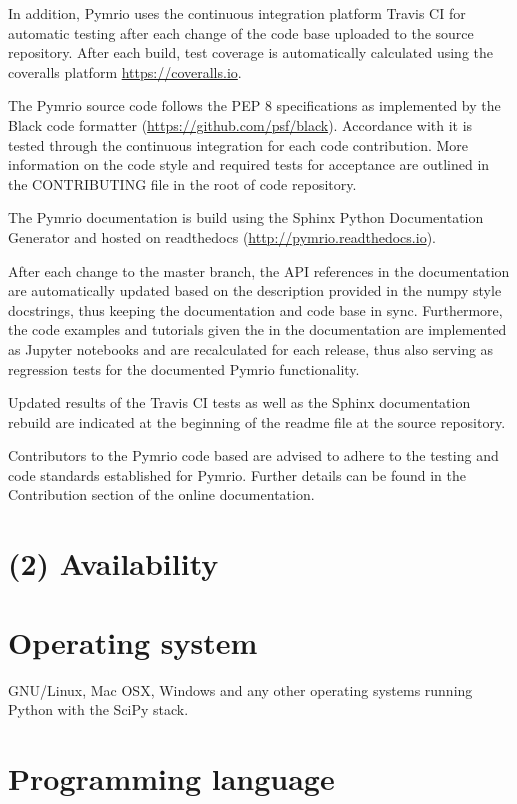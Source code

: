 \documentclass{jors}
\begin{document}
In addition, Pymrio uses the continuous integration platform Travis CI for automatic testing after each change of the code base uploaded to the source repository. After each build, test coverage is automatically calculated using the coveralls platform \url{https://coveralls.io}.

The Pymrio source code follows the PEP 8 specifications as implemented by the Black code formatter (\url{https://github.com/psf/black}). Accordance with it is tested through the continuous integration for each code contribution. More information on the code style and required tests for acceptance are outlined in the CONTRIBUTING file in the root of code repository. 

The Pymrio documentation is build using the Sphinx Python Documentation Generator and hosted on readthedocs (\url{http://pymrio.readthedocs.io}).

After each change to the master branch, the API references in the documentation are automatically updated based on the description provided in the numpy style docstrings, thus keeping the documentation and code base in sync.
Furthermore, the code examples and tutorials given the in the documentation are implemented as Jupyter notebooks and are recalculated for each release, thus also serving as regression tests for the documented Pymrio functionality.

Updated results of the Travis CI tests as well as the Sphinx documentation rebuild are indicated at the beginning of the readme file at the source repository. 

Contributors to the Pymrio code based are advised to adhere to the testing and code standards established for Pymrio. Further details can be found in the Contribution section of the online documentation. 

\section*{(2) Availability}
\vspace{0.5cm}
\section*{Operating system}

GNU/Linux, Mac OSX, Windows and any other operating systems running Python with the SciPy stack.

\section*{Programming language}
\end{document}
